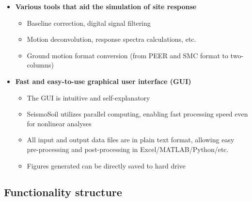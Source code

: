 \documentclass[11pt,letterpaper]{article}
\begin{document}
\begin{itemize}
\begin{itemize}
        \end{itemize}
    \item \textbf{\textsf{Various tools that aid the simulation of site response}}
        \begin{itemize}
            \item Baseline correction, digital signal filtering
            \item Motion deconvolution, response spectra calculations, etc.
            \item Ground motion format conversion (from PEER and SMC format to two-columns)
        \end{itemize}
    \item \textbf{\textsf{Fast and easy-to-use graphical user interface (GUI)}}
        \begin{itemize}
            \item The GUI is intuitive and self-explanatory
            \item SeismoSoil utilizes parallel computing, enabling fast processing speed even for nonlinear analyses
            \item All input and output data files are in plain text format, allowing easy pre-processing and post-processing in Excel/MATLAB/Python/etc.
            \item Figures generated can be directly saved to hard drive
        \end{itemize}
\end{itemize}

\newpage
\subsection{Functionality structure}
\end{document}
